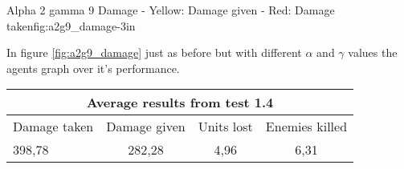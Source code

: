 			{Alpha 2 gamma 9 Damage - Yellow: Damage given - Red: Damage taken}{fig:a2g9_damage}{-3in}

In figure \ref{fig:a2g9_damage} just as before but with different $\alpha$ and $\gamma$ values the agents graph over it's performance.




\begin{centering}
 \begin{tabular}{|l||c|c|c|}
	\multicolumn{4}{c}{Average results from test 1.4} \\
	\hline
		Damage taken & Damage given & Units lost & Enemies killed\\
	\hline
		398,78 & 282,28 & 4,96 & 6,31 \\
	\hline

\end{tabular}
\end{centering}
